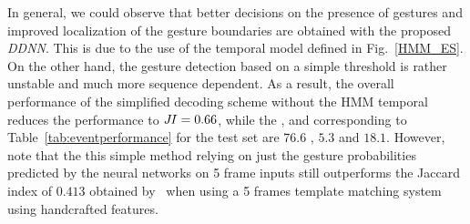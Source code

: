 In general, we could observe that better decisions on the presence of gestures and improved localization of the gesture boundaries are obtained with the proposed \emph{DDNN}.
This is due to the use of the temporal model defined in Fig.~\ref{HMM_ES}. On the other hand, the gesture detection based on a simple threshold is rather unstable and much more  sequence dependent.
%
As a result, the overall performance of the simplified decoding scheme without the HMM temporal reduces the performance to $J\hspace*{-0.1em}I= 0.66$,
while the \eventaccuracy, \eventconfused and \eventmissed corresponding
to Table~\ref{tab:eventperformance} for the test set are  $76.6$ , $5.3$ and $18.1$.
%
%
However, note  that the this simple method relying on just the gesture probabilities predicted by the
neural networks on  5 frame inputs still outperforms the Jaccard index of $0.413$
obtained by~\cite{camgoz2014gesture} when using a 5 frames template matching system
using handcrafted features.





